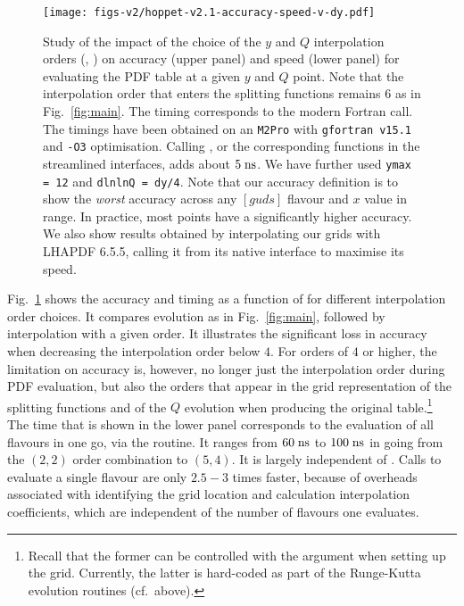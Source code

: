 \begin{figure}[tbp]
    \centering
        \texttt{[image: figs-v2/hoppet-v2.1-accuracy-speed-v-dy.pdf]}
    \caption{
      Study of the impact of the choice of the $y$ and $Q$ interpolation
      orders (, ) on accuracy (upper panel) and speed
      (lower panel) for evaluating
      the PDF table at a given $y$ and $Q$ point.
      Note that the interpolation order that enters the splitting
      functions remains $6$ as in Fig.~\ref{fig:main}.
      The timing corresponds to the  modern
      Fortran call.
      The timings have been
      obtained on an \texttt{M2Pro} with \texttt{gfortran v15.1} and
      \texttt{-O3} optimisation.
      Calling , or the corresponding
      functions in the streamlined interfaces, adds about $5\;\mathrm{ns}$.
      We have further used \texttt{ymax = 12} and
      \texttt{dlnlnQ = dy/4}.
      Note that our accuracy definition is to show the \emph{worst}
      accuracy across any $[guds]$ flavour and $x$ value in range.
      In practice, most points have a significantly higher
      accuracy. We also show results obtained by interpolating our
      grids with LHAPDF 6.5.5, calling it from its native \CPP
      interface to maximise its speed.  }
        \label{fig:interp-accuracy}
\end{figure}


Fig.~\ref{fig:interp-accuracy} shows the accuracy and timing as a
function of  for different interpolation order choices.
%
It compares evolution as in Fig.~\ref{fig:main}, followed by
interpolation with a given order.
%
It illustrates the significant loss in accuracy when decreasing
the interpolation order below $4$.
%
For orders of $4$ or higher, the limitation on accuracy is, however,
no longer just the interpolation order during PDF evaluation, but also
the orders that appear in the grid representation of the splitting
functions and of the $Q$ evolution when producing the original
table.\footnote{Recall that the former can be controlled with the
   argument when setting up the grid.
  Currently, the latter is hard-coded as part of the Runge-Kutta
  evolution routines (cf.\ above).
}
%
The time that is shown in the lower panel corresponds to the
evaluation of all flavours in one go, via the
 routine.
%
It ranges from $60\;\mathrm{ns}$ to $100\;\mathrm{ns}$ in going from the $(2,2)$ order
combination to $(5,4)$.
%
It is largely independent of .
%
Calls to evaluate a single flavour are only $2.5{-}3$ times faster,
because of overheads associated with identifying the grid location and
calculation interpolation coefficients, which are independent of the
number of flavours one evaluates.


